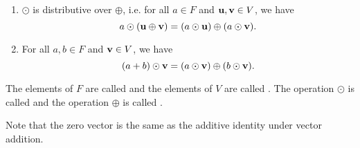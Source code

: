 \begin{defn}
\begin{enumerate}
    \item $ \odot $ is distributive over $ \oplus $, i.e. for all $ a\in F $ and $ \boldsymbol{\mathbf{u}},\boldsymbol{\mathbf{v}}\in V $, we have
    \begin{equation*}
        a\odot(\boldsymbol{\mathbf{u}}\oplus\boldsymbol{\mathbf{v}})=(a\odot\boldsymbol{\mathbf{u}})\oplus(a\odot\boldsymbol{\mathbf{v}}).
    \end{equation*}

    \item For all $ a,b\in F $ and $ \boldsymbol{\mathbf{v}}\in V $, we have
    \begin{equation*}
        (a+b)\odot\boldsymbol{\mathbf{v}}=(a\odot\boldsymbol{\mathbf{v}})\oplus(b\odot\boldsymbol{\mathbf{v}}).
    \end{equation*}
\end{enumerate}

The elements of $ F $ are called  and the elements of $ V $ are called . The operation $ \odot $ is called  and the operation $ \oplus $ is called .

Note that the zero vector is the same as the additive identity under vector addition.
\end{defn}